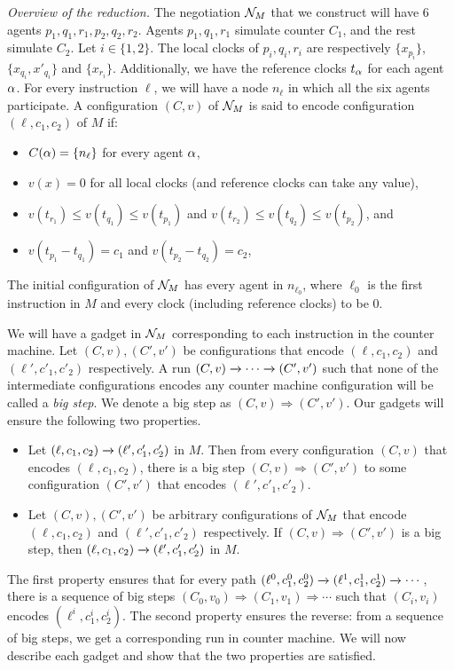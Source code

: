 \noindent \emph{Overview of the reduction.} The negotiation $\mathcal{N}_M$ that we
construct will have $6$ agents $p_1, q_1, r_1, p_2, q_2, r_2$. Agents
$p_1, q_1, r_1$ simulate counter $C_1$, and the rest simulate
$C_2$. Let $i \in \{1, 2\}$. The local clocks of $p_i, q_i, r_i$ are
respectively $\{x_{p_i}\}$, $\{x_{q_i}, x'_{q_i}\}$ and $\{x_{r_i}\}$. Additionally, we have the reference clocks $t_\alpha$ for each agent $\alpha$. For every instruction $\ell$, we will have a node
$n_\ell$ in which all the six agents participate.
A configuration $(C, v)$ of $\mathcal{N}_M$ is said to encode configuration
$(\ell, c_1, c_2)$ of $M$ if:
\begin{itemize}
\item $C(\alpha) = \{n_\ell\}$ for every agent $\alpha$,
\item $v(x) = 0$ for all local clocks (and reference clocks can take any value),
\item $v(t_{r_1}) \le v(t_{q_1}) \le v(t_{p_1})$ and $v(t_{r_2}) \le v(t_{q_2}) \le v(t_{p_2})$, and 
\item $v(t_{p_1} - t_{q_1}) = c_1$ and $v(t_{p_2} - t_{q_2}) = c_2$,
\end{itemize}
The initial configuration of $\mathcal{N}_M$ has every agent in $n_{\ell_0}$, where $\ell_0$ is the first instruction in $M$ and every clock (including reference clocks) to be $0$.

We will have a gadget in $\mathcal{N}_M$ corresponding to each instruction in the counter machine. Let $(C, v), (C',v')$ be configurations that encode $(\ell, c_1, c_2)$ and $(\ell', c'_1, c'_2)$ respectively. A run $(C, v) \xrightarrow{} \cdots \xrightarrow{} (C', v')$ such that none of the intermediate configurations encodes any counter machine configuration will be called a \emph{big step}. We denote a big step as $(C, v) \Rightarrow (C', v')$. Our gadgets will ensure the following two properties.
\begin{itemize}
\item Let $(\ell, c_1, c_2) \xrightarrow{} (\ell', c'_1, c'_2)$ in $M$. Then from every configuration $(C, v)$ that encodes $(\ell, c_1, c_2)$, there is a big step $(C, v) \Rightarrow (C', v')$ to some configuration $(C', v')$ that encodes $(\ell', c'_1, c'_2)$.
\item Let $(C, v), (C', v')$ be arbitrary configurations of $\mathcal{N}_M$ that encode $(\ell, c_1, c_2)$ and $(\ell', c'_1, c'_2)$ respectively. If $(C, v) \Rightarrow (C', v')$ is a big step, then $(\ell, c_1, c_2) \xrightarrow{} (\ell', c'_1, c'_2)$ in $M$.
\end{itemize}
The first property ensures that for every path $(\ell^0, c^0_1, c^0_2)
\xrightarrow{} (\ell^1, c^1_1, c^1_2) \xrightarrow{} \cdots$, there is a sequence of
big steps $(C_0, v_0) \Rightarrow (C_1, v_1) \Rightarrow \cdots$ such
that  $(C_i, v_i)$ encodes $(\ell^i, c^i_1, c^i_2)$. The second
property ensures the reverse: from a sequence of big steps, we get
a corresponding run in counter machine. We will now describe each
gadget and show that the two properties are satisfied.  

